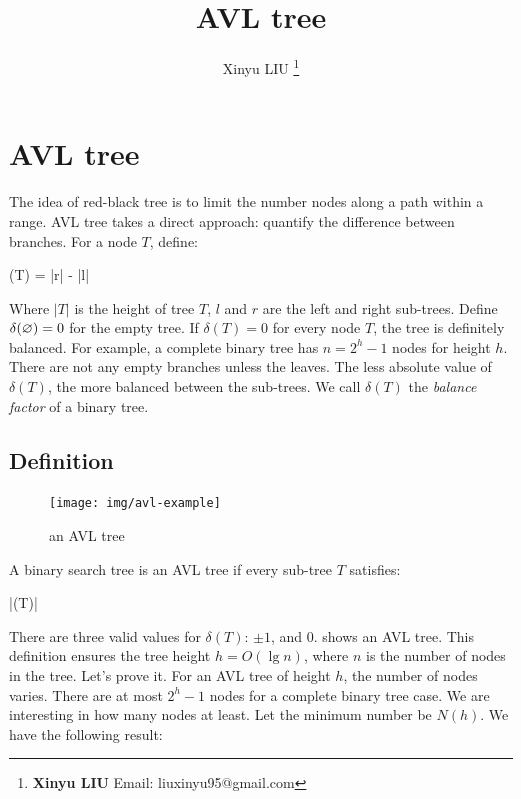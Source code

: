 \documentclass[b5paper]{article}
\begin{document}
\title{AVL tree}

\author{Xinyu LIU
\thanks{{\bfseries Xinyu LIU} \newline
  Email: liuxinyu95@gmail.com \newline}
  }

\maketitle
\fi


\ifx\wholebook\relax
\chapter{AVL tree}
\fi

\label{introduction} 

The idea of red-black tree is to limit the number nodes along a path within a range. AVL tree takes a direct approach: quantify the difference between branches. For a node $T$, define:

\be
  \delta(T) = |r| - |l|
\ee

Where $|T|$ is the height of tree $T$, $l$ and $r$ are the left and right sub-trees. Define $\delta(\varnothing) = 0$ for the empty tree. If $\delta(T) = 0$ for every node $T$, the tree is definitely balanced. For example, a complete binary tree has $n=2^h - 1$ nodes for height $h$. There are not any empty branches unless the leaves. The less absolute value of $\delta(T)$, the more balanced between the sub-trees. We call $\delta(T)$ the {\em balance factor} of a binary tree.

\section{Definition}

\begin{figure}[htbp]
   \centering
   \texttt{[image: img/avl-example]}
   \caption{an AVL tree}
   \label{fig:avl-example}
\end{figure}

A binary search tree is an AVL tree if every sub-tree $T$ satisfies:

\be
  |\delta(T)| 
  \label{eq:avl-rule}
\ee

There are three valid values for $\delta(T)$: $\pm 1$, and 0.  shows an AVL tree. This definition ensures the tree height $h = O(\lg n)$, where $n$ is the number of nodes in the tree. Let's prove it. For an AVL tree of height $h$, the number of nodes varies. There are at most $2^h - 1$ nodes for a complete binary tree case. We are interesting in how many nodes at least. Let the minimum number be $N(h)$. We have the following result:
\end{document}
